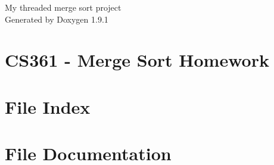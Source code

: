 \let\mypdfximage\pdfximage\def\pdfximage{\immediate\mypdfximage}\documentclass[twoside]{book}
\newcommand{\+}{\discretionary{\mbox{\scriptsize$\hookleftarrow$}}{}{}}
\newcommand{\clearemptydoublepage}{%
  \newpage{\pagestyle{empty}\cleardoublepage}%
}
\begin{document}
\raggedbottom

\hypersetup{pageanchor=false,
             bookmarksnumbered=true,
             pdfencoding=unicode
            }
\begin{titlepage}
\vspace*{7cm}
\begin{center}%
{\Large My threaded merge sort project }\\
\vspace*{1cm}
{\large Generated by Doxygen 1.9.1}\\
\end{center}
\end{titlepage}
\clearemptydoublepage
{}
\tableofcontents
\clearemptydoublepage
{}
\hypersetup{pageanchor=true}

\chapter{CS361 -\/ Merge Sort Homework}
\label{index}\hypertarget{index}{}
\chapter{File Index}

\chapter{File Documentation}







\backmatter
\newpage
{}
\clearemptydoublepage
{}
\printindex
\end{document}
